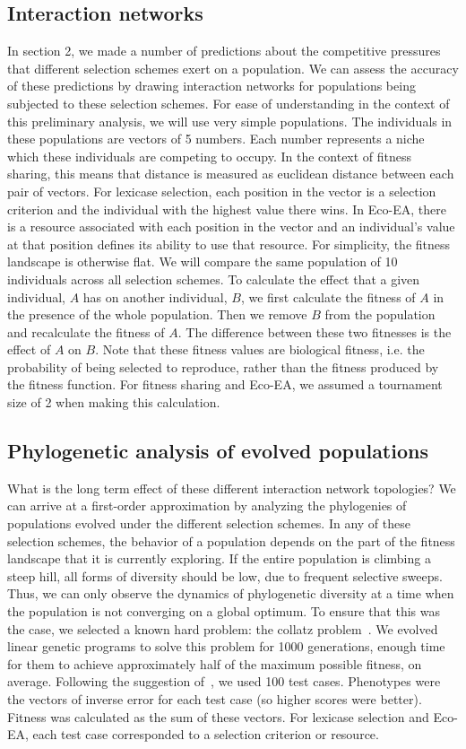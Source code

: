 \subsection{Interaction networks}
In section 2, we made a number of predictions about the competitive pressures that different selection schemes exert on a population. We can assess the accuracy of these predictions by drawing interaction networks for populations being subjected to these selection schemes. For ease of understanding in the context of this preliminary analysis, we will use very simple populations. The individuals in these populations are vectors of 5 numbers. Each number represents a niche which these individuals are competing to occupy. In the context of fitness sharing, this means that distance is measured as euclidean distance between each pair of vectors. For lexicase selection, each position in the vector is a selection criterion and the individual with the highest value there wins. In Eco-EA, there is a resource associated with each position in the vector and an individual's value at that position defines its ability to use that resource. For simplicity, the fitness landscape is otherwise flat. We will compare the same population of 10 individuals across all selection schemes. To calculate the effect that a given individual, $A$ has on another individual, $B$, we first calculate the fitness of $A$ in the presence of the whole population. Then we remove $B$ from the population and recalculate the fitness of $A$. The difference between these two fitnesses is the effect of $A$ on $B$. Note that these fitness values are biological fitness, i.e. the probability of being selected to reproduce, rather than the fitness produced by the fitness function.  For fitness sharing and Eco-EA, we assumed a tournament size of 2 when making this calculation.

\subsection{Phylogenetic analysis of evolved populations}
What is the long term effect of these different interaction network topologies? We can arrive at a first-order approximation by analyzing the phylogenies of populations evolved under the different selection schemes. In any of these selection schemes, the behavior of a population depends on the part of the fitness landscape that it is currently exploring. If the entire population is climbing a steep hill, all forms of diversity should be low, due to frequent selective sweeps. Thus, we can only observe the dynamics of phylogenetic diversity at a time when the population is not converging on a global optimum. To ensure that this was the case, we selected a known hard problem: the collatz problem~\cite{helmuth_general_2015}. We evolved linear genetic programs to solve this problem for 1000 generations, enough time for them to achieve approximately half of the maximum possible fitness, on average. Following the suggestion of~\cite{helmuth_general_2015}, we used 100 test cases. Phenotypes were the vectors of inverse error for each test case (so higher scores were better). Fitness was calculated as the sum of these vectors. For lexicase selection and Eco-EA, each test case corresponded to a selection criterion or resource. 

